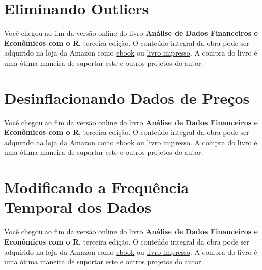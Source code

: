 \documentclass[
  11pt,
]{book}
\newenvironment{pleasebuyit}
{\begin{noteblock}
		
	} {\end{noteblock}}
\begin{document}
\hypertarget{fct-replace}{%
\section{Eliminando Outliers}\label{fct-replace}}

\begin{pleasebuyit}
Você chegou ao fim da versão online do livro \textbf{Análise de Dados
Financeiros e Econômicos com o R}, terceira edição. O conteúdo integral
da obra pode ser adquirido na loja da Amazon como
\href{https://www.amazon.com.br/dp/B08WNC27ZY}{ebook} ou
\href{https://www.amazon.com/dp/B08WP8CCDB}{livro impresso}. A compra do
livro é uma ótima maneira de suportar este e outros projetos do autor.
\end{pleasebuyit}

\hypertarget{desinflacionando-dados-de-preuxe7os}{%
\section{Desinflacionando Dados de Preços}\label{desinflacionando-dados-de-preuxe7os}}

\begin{pleasebuyit}
Você chegou ao fim da versão online do livro \textbf{Análise de Dados
Financeiros e Econômicos com o R}, terceira edição. O conteúdo integral
da obra pode ser adquirido na loja da Amazon como
\href{https://www.amazon.com.br/dp/B08WNC27ZY}{ebook} ou
\href{https://www.amazon.com/dp/B08WP8CCDB}{livro impresso}. A compra do
livro é uma ótima maneira de suportar este e outros projetos do autor.
\end{pleasebuyit}

\hypertarget{modificando-a-frequuxeancia-temporal-dos-dados}{%
\section{Modificando a Frequência Temporal dos Dados}\label{modificando-a-frequuxeancia-temporal-dos-dados}}

\begin{pleasebuyit}
Você chegou ao fim da versão online do livro \textbf{Análise de Dados
Financeiros e Econômicos com o R}, terceira edição. O conteúdo integral
da obra pode ser adquirido na loja da Amazon como
\href{https://www.amazon.com.br/dp/B08WNC27ZY}{ebook} ou
\href{https://www.amazon.com/dp/B08WP8CCDB}{livro impresso}. A compra do
livro é uma ótima maneira de suportar este e outros projetos do autor.
\end{pleasebuyit}
\end{document}
